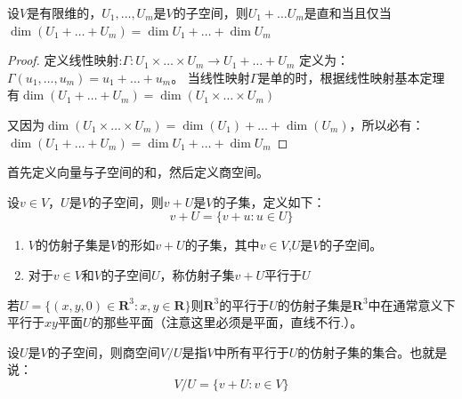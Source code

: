 \documentclass[10pt,a4paper,UTF8]{article}
\begin{document}
\begin{theorem}
设\(V\)是有限维的，\(U_{1},\ldots ,U_{m}\)是\(V\)的子空间，则\(U_{1} + \ldots U_{m}\)是直和当且仅当\(\dim(U_{1} + \ldots + U_{m}) = \dim U_{1} + \ldots + \dim U_{m}\)
\end{theorem}

\begin{proof}
定义线性映射:\(\Gamma: U_{1}\times \ldots \times U_{m}\rightarrow U_{1} + \ldots +U_{m}\) 定义为：\(\Gamma(u_{1},\ldots ,u_{m}) = u_{1} + \ldots + u_{m}\)。 当线性映射\(\Gamma\)是单的时，根据线性映射基本定理有\(\dim(U_{1} +\ldots + U_{m}) = \dim(U_{1}\times \ldots \times U_{m})\)

又因为\(\dim(U_{1}\times \ldots \times U_{m}) = \dim(U_{1}) + \ldots + \dim(U_{m})\)，所以必有：
\(\dim(U_{1} + \ldots + U_{m}) = \dim U_{1} + \ldots + \dim U_{m}\)
\end{proof}



首先定义向量与子空间的和，然后定义商空间。

\begin{definition}
设\(v\in V\)，\(U\)是\(V\)的子空间，则\(v+U\)是\(V\)的子集，定义如下：
\begin{equation}
\label{eq:1}
v+U = \{v+u:u\in U\}
\end{equation}
\end{definition}

\begin{definition}
\begin{enumerate}
\item \(V\)的仿射子集是\(V\)的形如\(v+U\)的子集，其中\(v\in V\),\(U\)是\(V\)的子空间。
\item 对于\(v\in V\)和\(V\)的子空间\(U\)，称仿射子集\(v+U\)平行于\(U\)
\end{enumerate}
\end{definition}

\begin{instance}
若\(U=\{(x,y,0)\in \mathbf{R}^{3}:x,y\in \mathbf{R}\}\)则\(\mathbf{R}^{3}\)的平行于\(U\)的仿射子集是\(\mathbf{R}^{3}\)中在通常意义下平行于\(xy\)平面\(U\)的那些平面（注意这里必须是平面，直线不行.）。
\end{instance}

\begin{definition}
设\(U\)是\(V\)的子空间，则商空间\(V/U\)是指\(V\)中所有平行于\(U\)的仿射子集的集合。也就是说：
\begin{equation}
\label{eq:2}
V/U = \{v+U:v\in V\}
\end{equation}
\end{definition}
\end{document}
